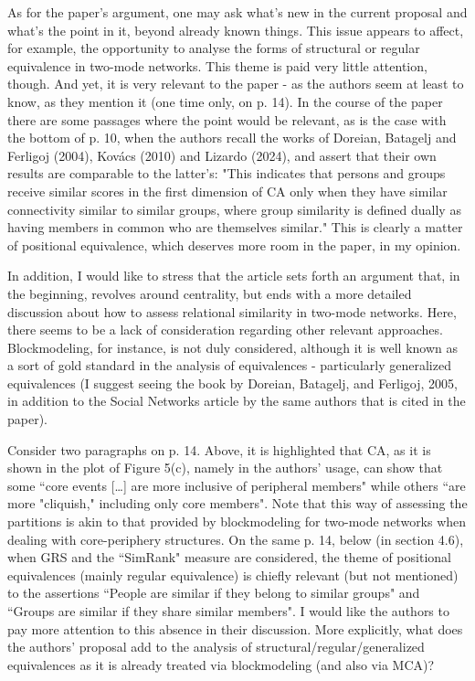 \documentclass[]{letter}
\begin{document}
As for the paper's argument, one may ask what's new in the current proposal and what's the point in it, beyond already known things. This issue appears to affect, for example, the opportunity to analyse the forms of structural or regular equivalence in two-mode networks. This theme is paid very little attention, though. And yet, it is very relevant to the paper - as the authors seem at least to know, as they mention it (one time only, on p. 14). In the course of the paper there are some passages where the point would be relevant, as is the case with the bottom of p. 10, when the authors recall the works of Doreian, Batagelj and Ferligoj (2004), Kovács (2010) and Lizardo (2024), and assert that their own results are comparable to the latter's: "This indicates that persons and groups receive similar scores in the first dimension of CA only when they have similar connectivity similar to similar groups, where group similarity is defined dually as having members in common who are themselves similar." This is clearly a matter of positional equivalence, which deserves more room in the paper, in my opinion.

In addition, I would like to stress that the article sets forth an argument that, in the beginning, revolves around centrality, but ends with a more detailed discussion about how to assess relational similarity in two-mode networks. Here, there seems to be a lack of consideration regarding other relevant approaches. Blockmodeling, for instance, is not duly considered, although it is well known as a sort of gold standard in the analysis of equivalences - particularly generalized equivalences (I suggest seeing the book by Doreian, Batagelj, and Ferligoj, 2005, in addition to the Social Networks article by the same authors that is cited in the paper).

Consider two paragraphs on p. 14. Above, it is highlighted that CA, as it is shown in the plot of Figure 5(c), namely in the authors' usage, can show that some ``core events […] are more inclusive of peripheral members" while others ``are more "cliquish," including only core members". Note that this way of assessing the partitions is akin to that provided by blockmodeling for two-mode networks when dealing with core-periphery structures. On the same p. 14, below (in section 4.6), when GRS and the ``SimRank" measure are considered, the theme of positional equivalences (mainly regular equivalence) is chiefly relevant (but not mentioned) to the assertions ``People are similar if they belong to similar groups" and ``Groups are similar if they share similar members". I would like the authors to pay more attention to this absence in their discussion. More explicitly, what does the authors' proposal add to the analysis of structural/regular/generalized equivalences as it is already treated via blockmodeling (and also via MCA)?
\end{document}
